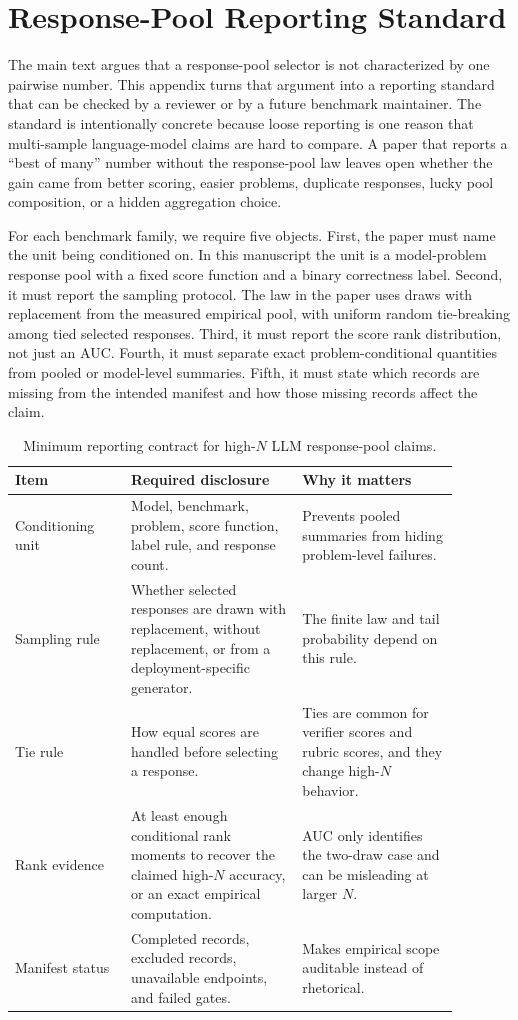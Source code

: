 \section{Response-Pool Reporting Standard}
\label{app:reporting-standard}

The main text argues that a response-pool selector is not characterized by one
pairwise number. This appendix turns that argument into a reporting standard
that can be checked by a reviewer or by a future benchmark maintainer. The
standard is intentionally concrete because loose reporting is one reason that
multi-sample language-model claims are hard to compare. A paper that reports a
``best of many'' number without the response-pool law leaves open whether the
gain came from better scoring, easier problems, duplicate responses, lucky
pool composition, or a hidden aggregation choice.

For each benchmark family, we require five objects. First, the paper must name
the unit being conditioned on. In this manuscript the unit is a model-problem
response pool with a fixed score function and a binary correctness label.
Second, it must report the sampling protocol. The law in the paper uses draws
with replacement from the measured empirical pool, with uniform random
tie-breaking among tied selected responses. Third, it must report the score
rank distribution, not just an AUC. Fourth, it must separate exact
problem-conditional quantities from pooled or model-level summaries. Fifth, it
must state which records are missing from the intended manifest and how those
missing records affect the claim.

\begin{table}[t]
\centering
\small
\caption{Minimum reporting contract for high-$N$ LLM response-pool claims.}
\label{tab:reporting-standard}
\begin{tabular}{p{0.23\linewidth}p{0.34\linewidth}p{0.31\linewidth}}
\toprule
Item & Required disclosure & Why it matters \\
\midrule
Conditioning unit &
Model, benchmark, problem, score function, label rule, and response count. &
Prevents pooled summaries from hiding problem-level failures. \\
Sampling rule &
Whether selected responses are drawn with replacement, without replacement, or
from a deployment-specific generator. &
The finite law and tail probability depend on this rule. \\
Tie rule &
How equal scores are handled before selecting a response. &
Ties are common for verifier scores and rubric scores, and they change
high-$N$ behavior. \\
Rank evidence &
At least enough conditional rank moments to recover the claimed high-$N$
accuracy, or an exact empirical computation. &
AUC only identifies the two-draw case and can be misleading at larger $N$. \\
Manifest status &
Completed records, excluded records, unavailable endpoints, and failed gates. &
Makes empirical scope auditable instead of rhetorical. \\
\bottomrule
\end{tabular}
\end{table}


